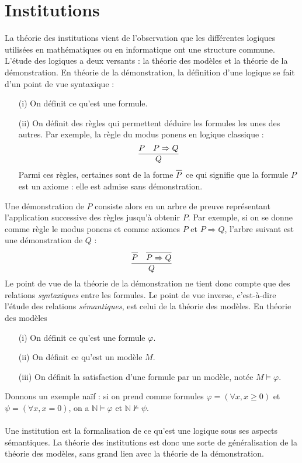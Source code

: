 \documentclass[11pt,a4paper]{article}
\newcommand{\ph}{\varphi}
\newcommand{\il}{\textit}
\newcommand{\N}{\mathbb{N}}
\newcommand{\1}{\mathbbm{1}}
\begin{document}
\section{Institutions}
La théorie des institutions vient de l'observation que les différentes logiques utilisées en mathématiques ou en informatique ont une structure commune. L'étude des logiques a deux versants : la théorie des modèles et la théorie de la démonstration. En théorie de la démonstration, la définition d'une logique se fait d'un point de vue syntaxique :
\begin{itemize}
\setlength\itemsep{-0.3em}
\item[(i)] On définit ce qu'est une formule.
\item[(ii)] On définit des règles qui permettent déduire les formules les unes des autres. Par exemple, la règle du modus ponens en logique classique :
$$\infer{Q}{P & P \Rightarrow Q}$$
Parmi ces règles, certaines sont de la forme $ \infer{P}{}$ ce qui signifie que la formule $P$ est un axiome : elle est admise sans démonstration.
\end{itemize}
Une démonstration de $P$ consiste alors en un arbre de preuve représentant l'application successive des règles jusqu'à obtenir $P$. Par exemple, si on se donne comme règle le modus ponens et comme axiomes $P$ et $P \Rightarrow Q$, l'arbre suivant est une démonstration de $Q$ :
$$ \infer{Q}{\infer{P}{} & \infer{P\Rightarrow Q}{}} $$
Le point de vue de la théorie de la démonstration ne tient donc compte que des relations \il{syntaxiques} entre les formules. Le point de vue inverse, c'est-à-dire l'étude des relations \il{sémantiques}, est celui de la théorie des modèles. En théorie des modèles
\begin{itemize}
\setlength\itemsep{-0.3em}
\item[(i)] On définit ce qu'est une formule $\ph$.
\item[(ii)] On définit ce qu'est un modèle $M$.
\item[(iii)] On définit la satisfaction d'une formule par un modèle, notée $M \models \ph$.
\end{itemize}
Donnons un exemple naïf : si on prend comme formules $\ph = (\forall x, x \geq 0)$ et $\psi = (\forall x, x = 0)$, on a $\N \models \ph$ et $\N \not\models \psi$.\\\\
Une institution est la formalisation de ce qu'est une logique sous ses aspects sémantiques. La théorie des institutions est donc une sorte de généralisation de la théorie des modèles, sans grand lien avec la théorie de la démonstration.
\end{document}
